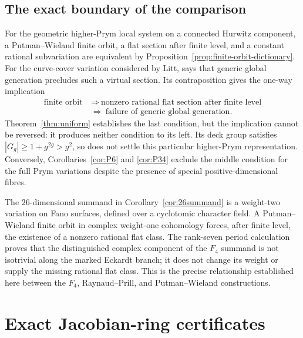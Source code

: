 \documentclass[11pt,reqno]{amsart}
\numberwithin{equation}{section}
\theoremstyle{definition}
\theoremstyle{remark}
\begin{document}
\subsection{The exact boundary of the comparison}

For the geometric higher-Prym local system on a connected Hurwitz component, a Putman--Wieland finite orbit, a flat section after finite level, and a constant rational subvariation are equivalent by Proposition~\ref{prop:finite-orbit-dictionary}.  For the curve-cover variation considered by Litt, \cite[Proposition~6.3.2]{Litt2024} says that generic global generation precludes such a virtual section.  Its contraposition gives the one-way implication
\begin{equation}\label{eq:logical-chain}
\begin{aligned}
\text{finite orbit}
&\ \Longrightarrow\ 
\text{nonzero rational flat section after finite level}\\
&\ \Longrightarrow\
\text{failure of generic global generation}.
\end{aligned}
\end{equation}
Theorem~\ref{thm:uniform} establishes the last condition, but the implication cannot be reversed: it produces neither condition to its left.  Its deck group satisfies $|G_g|\ge1+g^{2g}>g^2$, so \cite[Theorem~1.2]{LandesmanLitt2023} does not settle this particular higher-Prym representation.  Conversely, Corollaries~\ref{cor:P6} and \ref{cor:P34} exclude the middle condition for the full Prym variations despite the presence of special positive-dimensional fibres.

The $26$-dimensional summand in Corollary~\ref{cor:26summand} is a weight-two variation on Fano surfaces, defined over a cyclotomic character field.  A Putman--Wieland finite orbit in complex weight-one cohomology forces, after finite level, the existence of a nonzero rational flat class.  The rank-seven period calculation proves that the distinguished complex component of the $F_4$ summand is not isotrivial along the marked Eckardt branch; it does not change its weight or supply the missing rational flat class.  This is the precise relationship established here between the $F_4$, Raynaud--Prill, and Putman--Wieland constructions.

\appendix

\section{Exact Jacobian-ring certificates}\label{app:certificates}
\end{document}
